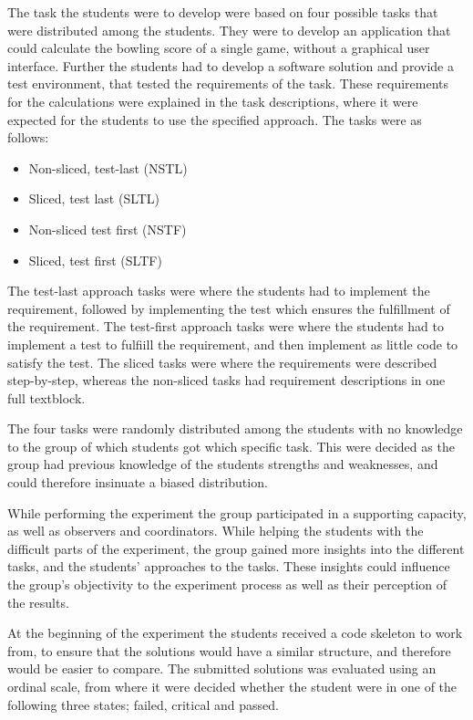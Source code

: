 \documentclass{sig-alternate-05-2015}
\begin{document}
The task the students were to develop were based on four possible tasks that were distributed among the students. They were to develop an application that could calculate the bow\-ling score of a single game, without a graphical user interface. Further the students had to develop a software solution and provide a test environment, that tested the requirements of the task. These requirements for the calculations were explained in the task descriptions, where it were expected for the students to use the specified approach.
The tasks were as follows:
\begin{itemize}
	\item Non-sliced, test-last (NSTL)
	\item Sliced, test last (SLTL)
	\item Non-sliced test first (NSTF)
	\item Sliced, test first (SLTF)
\end{itemize}
The test-last approach tasks were where the students had to implement the requirement, followed by implementing the test which ensures the fulfillment of the requirement.
The test-first approach tasks were where the students had to implement a test to fulfiill the requirement, and then implement as little code to satisfy the test.
The sliced tasks were where the requirements were described step-by-step, whereas the non-sliced tasks had requirement descriptions in one full textblock.


The four tasks were randomly distributed among the students with no knowledge to the group of which students got which specific task. This were decided as the group had previous knowledge of the students strengths and weaknesses, and could therefore insinuate a biased distribution.

While performing the experiment the group participated in a supporting capacity, as well as observers and coordinators. While helping the students with the difficult parts of the experiment, the group gained more insights into the different tasks, and the students' approaches to the tasks. These insights could influence the group's objectivity to the experiment process as well as their perception of the results.

At the beginning of the experiment the students received a code skeleton to work from, to ensure that the solutions would have a similar structure, and therefore would be easier to compare. The submitted solutions was evaluated using an ordinal scale, from where it were decided whether the student were in one of the following three states; failed, critical and passed.
\end{document}
